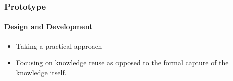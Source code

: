 \documentclass{beamer}
\begin{document}

\begin{frame}

\frametitle{Prototype}
\framesubtitle{Design and Development}

\begin{itemize}
\item Taking a practical approach
\item Focusing on knowledge reuse as opposed to the formal capture of the
				knowledge itself.
\end{itemize}

\end{frame}


\end{document}
